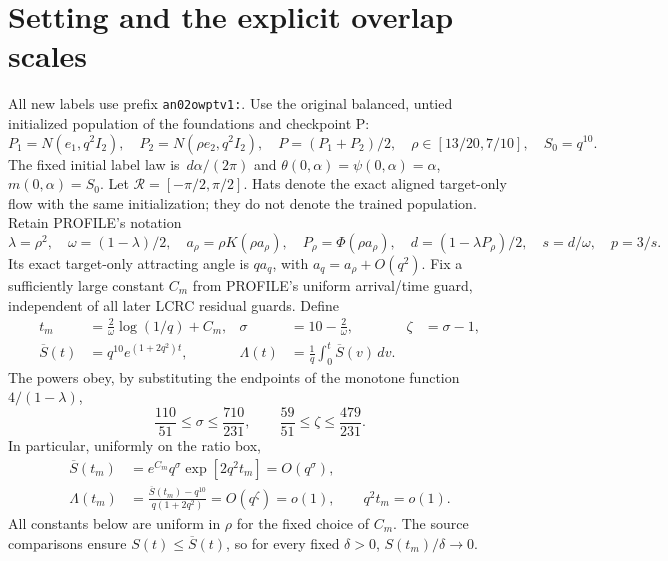 \documentclass[11pt]{article}
\theoremstyle{remark}\newtheorem{remark}[theorem]{Remark}
\newcommand{\dd}{\,d}
\newcommand{\Rhalf}{\mathcal R}
\begin{document}
\section{Setting and the explicit overlap scales}
All new labels use prefix \texttt{an02owptv1:}.
Use the original balanced, untied initialized population of the
foundations and checkpoint P:
\[
 P_1=N(e_1,q^2I_2),\quad P_2=N(\rho e_2,q^2I_2),\quad
 P=(P_1+P_2)/2,\quad \rho\in[13/20,7/10],\quad S_0=q^{10}.
\]
The fixed initial label law is $\dd\alpha/(2\pi)$ and
$\theta(0,\alpha)=\psi(0,\alpha)=\alpha$, $m(0,\alpha)=S_0$.
Let $\Rhalf=[-\pi/2,\pi/2]$. Hats denote the exact aligned
target-only flow with the same initialization; they do not denote
the trained population.
Retain PROFILE's notation
\[
 \lambda=\rho^2,\quad \omega=(1-\lambda)/2,\quad
 a_\rho=\rho K(\rho a_\rho),\quad P_\rho=\Phi(\rho a_\rho),\quad
 d=(1-\lambda P_\rho)/2,\quad s=d/\omega,\quad p=3/s.
\]
Its exact target-only attracting angle is $qa_q$, with
$a_q=a_\rho+O(q^2)$. Fix a sufficiently large constant $C_m$
from PROFILE's uniform arrival/time guard, independent of all later
LCRC residual guards. Define
\begin{align}
 t_m&=\frac2\omega\log(1/q)+C_m,
 &\sigma&=10-\frac2\omega,
 &\zeta&=\sigma-1,\label{an02owptv1:time}\\
 \overline S(t)&=q^{10}e^{(1+2q^2)t},
 &\Lambda(t)&=\frac1q\int_0^t\overline S(v)\dd v.
 \label{an02owptv1:envelope}
\end{align}
The powers obey, by substituting the endpoints of the monotone
function $4/(1-\lambda)$,
\begin{equation}\label{an02owptv1:powers}
 \frac{110}{51}\le\sigma\le\frac{710}{231},\qquad
 \frac{59}{51}\le\zeta\le\frac{479}{231}.
\end{equation}
In particular, uniformly on the ratio box,
\begin{align}
 \overline S(t_m)&=e^{C_m}q^\sigma
                  \exp[2q^2t_m]=O(q^\sigma),
 \label{an02owptv1:massscale}\\
 \Lambda(t_m)&=
 \frac{\overline S(t_m)-q^{10}}{q(1+2q^2)}
 =O(q^\zeta)=o(1),\qquad q^2t_m=o(1).
 \label{an02owptv1:defectscale}
\end{align}
All constants below are uniform in $\rho$ for the fixed choice of
$C_m$. The source comparisons ensure $S(t)\le\overline S(t)$,
so for every fixed $\delta>0$, $S(t_m)/\delta\to0$.
\end{document}
